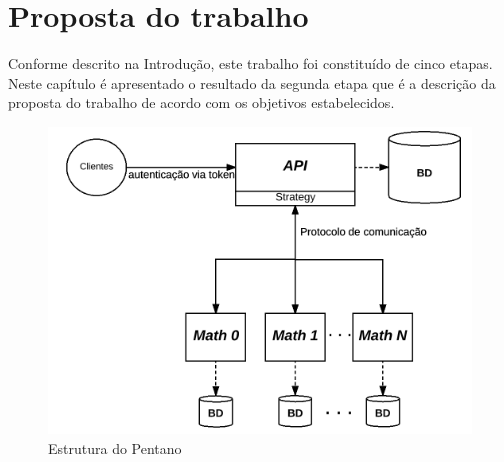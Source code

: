 \chapter{Proposta do trabalho} \label{cap:proposta}

Conforme descrito na Introdução, este trabalho foi constituído de cinco etapas.
Neste capítulo é apresentado o resultado da segunda etapa que é a descrição da proposta do trabalho de acordo com os objetivos estabelecidos.
% 
% 
\begin{figure}[h!]
\centering
\includegraphics[scale=0.7]{figuras/esquema_pentano_2.png}
\caption{Estrutura do Pentano}
\label{fig:pentano}
\end{figure}
% 
% 
